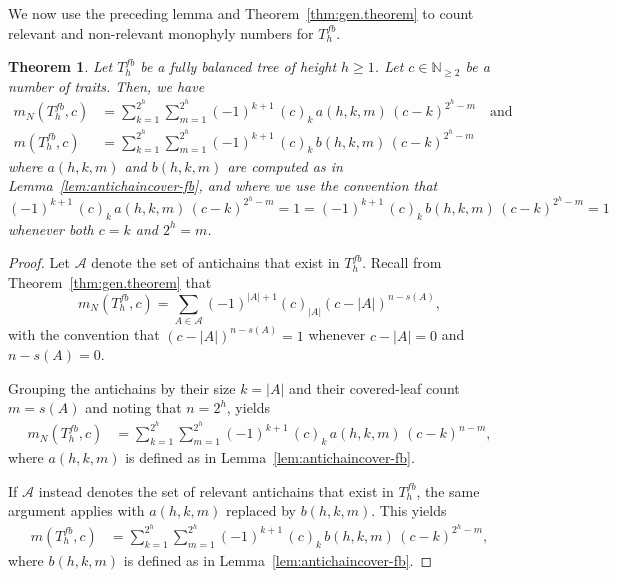 \documentclass{amsart}
\newtheorem{theorem}{Theorem}
\theoremstyle{definition}
\begin{document}
We now use the preceding lemma and Theorem~\ref{thm:gen.theorem} to count relevant and non-relevant monophyly numbers for $T_h^{fb}$.


\begin{theorem}\label{thm_fbvalue}
Let $T_h^{fb}$ be a fully balanced tree of height $h \geq 1$. Let $c\in\mathbb{N}_{\geq 2}$ be a number of traits. Then, we have 
\begin{align*}
    m_N(T_h^{fb},c) &= \sum\limits_{k = 1}^{2^h} \sum\limits_{m =1}^{2^h} (-1)^{k+1} \, (c)_k \, a(h,k,m) \, (c-k)^{2^h-m} \quad \text{and}\\
    m(T_h^{fb},c)&=\sum\limits_{k =1}^{2^h} \sum\limits_{m =1}^{2^h} (-1)^{k+1} \, (c)_k \, b(h,k,m) \, (c-k)^{2^h-m}
\end{align*}
where $a(h,k,m)$ and $b(h,k,m)$ are computed as in Lemma~\ref{lem:antichaincover-fb}, and where we use the convention that $(-1)^{k+1} \, (c)_k \, a(h,k,m) \, (c-k)^{2^h-m} = 1 = (-1)^{k+1} \, (c)_k \, b(h,k,m) \, (c-k)^{2^h-m} = 1$ whenever both $c=k$ and $2^h=m$.
\end{theorem}


\begin{proof}
Let $\mathcal{A}$ denote the set of antichains that exist in $T_h^{fb}$.
Recall from Theorem~\ref{thm:gen.theorem} that 
\[m_N(T_h^{fb},c) = \sum_{A \in \mathcal{A}} (-1)^{|A|+1} (c)_{|A|} (c-|A|)^{n-s(A)},\]
with the convention that $(c-|A|)^{n-s(A)}=1$ whenever $c-|A|=0$ and $n-s(A)=0$. 

Grouping the antichains by their size $k = |A|$ and their covered-leaf count $m = s(A)$ and noting that $n=2^h$, yields
\begin{align*}
    m_N(T_h^{fb},c) &= \sum\limits_{k =1}^{2^h} \sum\limits_{m =1}^{2^h} (-1)^{k+1} \, (c)_k \, a(h,k,m) \, (c-k)^{n-m},
\end{align*}
where $a(h,k,m)$ is defined as in Lemma~\ref{lem:antichaincover-fb}.

If $\mathcal{A}$ instead denotes the set of relevant antichains that exist in $T_h^{fb}$, the same argument applies with $a(h,k,m)$ replaced by $b(h,k,m)$. This yields
\begin{align*}
    m(T_h^{fb},c) &= \sum\limits_{k = 1}^{2^h} \sum\limits_{m = 1}^{2^h} (-1)^{k+1} \, (c)_k \, b(h,k,m) \, (c-k)^{2^h-m},
\end{align*}
where $b(h,k,m)$ is defined as in Lemma~\ref{lem:antichaincover-fb}.

\end{proof} 
\end{document}
